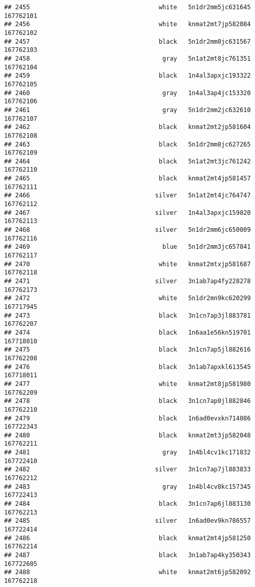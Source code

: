 \documentclass[
]{article}
\begin{document}
\begin{verbatim}
## 2455                                   white   5n1dr2mm5jc631645 167762101
## 2456                                   white   knmat2mt7jp582084 167762102
## 2457                                   black   5n1dr2mm0jc631567 167762103
## 2458                                    gray   5n1at2mt8jc761351 167762104
## 2459                                   black   1n4al3apxjc193322 167762105
## 2460                                    gray   1n4al3ap4jc153320 167762106
## 2461                                    gray   5n1dr2mm2jc632610 167762107
## 2462                                   black   knmat2mt2jp581604 167762108
## 2463                                   black   5n1dr2mm8jc627265 167762109
## 2464                                   black   5n1at2mt3jc761242 167762110
## 2465                                   black   knmat2mt4jp581457 167762111
## 2466                                  silver   5n1at2mt4jc764747 167762112
## 2467                                  silver   1n4al3apxjc159820 167762113
## 2468                                  silver   5n1dr2mm6jc650009 167762116
## 2469                                    blue   5n1dr2mm3jc657841 167762117
## 2470                                   white   knmat2mtxjp581687 167762118
## 2471                                  silver   3n1ab7ap4fy228278 167762173
## 2472                                   white   5n1dr2mn9kc620299 167717945
## 2473                                   black   3n1cn7ap3jl883781 167762207
## 2474                                   black   1n6aa1e56kn519701 167718010
## 2475                                   black   3n1cn7ap5jl882616 167762208
## 2476                                   black   3n1ab7apxkl613545 167718011
## 2477                                   white   knmat2mt8jp581980 167762209
## 2478                                   black   3n1cn7ap0jl882846 167762210
## 2479                                   black   1n6ad0evxkn714086 167722343
## 2480                                   black   knmat2mt3jp582048 167762211
## 2481                                    gray   1n4bl4cv1kc171832 167722410
## 2482                                  silver   3n1cn7ap7jl883833 167762212
## 2483                                    gray   1n4bl4cv8kc157345 167722413
## 2484                                   black   3n1cn7ap6jl883130 167762213
## 2485                                  silver   1n6ad0ev9kn786557 167722414
## 2486                                   black   knmat2mt4jp581250 167762214
## 2487                                   black   3n1ab7ap4ky350343 167722605
## 2488                                   white   knmat2mt6jp582092 167762218

\end{verbatim}
\end{document}
